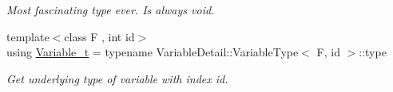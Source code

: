 \begin{DoxyCompactItemize}
\begin{DoxyCompactList}\small\item\em Most fascinating type ever. Is always void. \end{DoxyCompactList}\item 
\hypertarget{namespaceFunG_a3d589ef7d011a46a72847eabcbbb4532}{{\footnotesize template$<$class F , int id$>$ }\\using \hyperlink{namespaceFunG_a3d589ef7d011a46a72847eabcbbb4532}{Variable\-\_\-t} = typename Variable\-Detail\-::\-Variable\-Type$<$ F, id $>$\-::type}\label{namespaceFunG_a3d589ef7d011a46a72847eabcbbb4532}

\begin{DoxyCompactList}\small\item\em Get underlying type of variable with index id. \end{DoxyCompactList}\end{DoxyCompactItemize}
